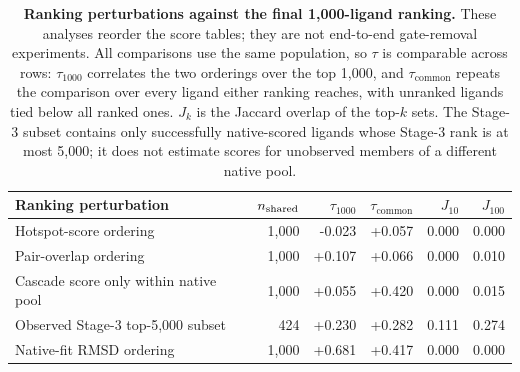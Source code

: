 \begin{table}[tbp]
\centering
\caption{\textbf{Ranking perturbations against the final 1,000-ligand ranking.}
These analyses reorder the score tables; they are not end-to-end gate-removal
experiments. All comparisons use the same population, so $\tau$ is comparable across
rows: $\tau_{1000}$ correlates the two orderings over the top 1,000, and
$\tau_\mathrm{common}$ repeats the comparison over every ligand either ranking
reaches, with unranked ligands tied below all ranked ones. $J_k$ is the Jaccard
overlap of the top-$k$ sets. The Stage-3 subset contains only successfully native-scored
ligands whose Stage-3 rank is at most 5,000; it does not estimate scores for
unobserved members of a different native pool.}
\label{tab:ablation}
\footnotesize
\setlength{\tabcolsep}{3.5pt}
\begin{tabular}{@{}lrrrrr@{}}
\toprule
Ranking perturbation & $n_{\rm shared}$ & $\tau_{1000}$ & $\tau_\mathrm{common}$ & $J_{10}$ & $J_{100}$ \\
\midrule
Hotspot-score ordering & 1,000 & -0.023 & +0.057 & 0.000 & 0.000 \\
Pair-overlap ordering & 1,000 & +0.107 & +0.066 & 0.000 & 0.010 \\
Cascade score only within native pool & 1,000 & +0.055 & +0.420 & 0.000 & 0.015 \\
Observed Stage-3 top-5,000 subset & 424 & +0.230 & +0.282 & 0.111 & 0.274 \\
Native-fit RMSD ordering & 1,000 & +0.681 & +0.417 & 0.000 & 0.000 \\
\bottomrule
\end{tabular}
\end{table}
